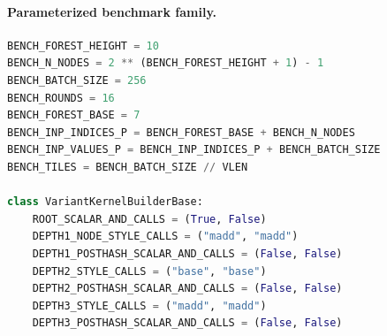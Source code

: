 \paragraph{Parameterized benchmark family.}
\begin{lstlisting}[style=papercode,language=Python]
BENCH_FOREST_HEIGHT = 10
BENCH_N_NODES = 2 ** (BENCH_FOREST_HEIGHT + 1) - 1
BENCH_BATCH_SIZE = 256
BENCH_ROUNDS = 16
BENCH_FOREST_BASE = 7
BENCH_INP_INDICES_P = BENCH_FOREST_BASE + BENCH_N_NODES
BENCH_INP_VALUES_P = BENCH_INP_INDICES_P + BENCH_BATCH_SIZE
BENCH_TILES = BENCH_BATCH_SIZE // VLEN

class VariantKernelBuilderBase:
    ROOT_SCALAR_AND_CALLS = (True, False)
    DEPTH1_NODE_STYLE_CALLS = ("madd", "madd")
    DEPTH1_POSTHASH_SCALAR_AND_CALLS = (False, False)
    DEPTH2_STYLE_CALLS = ("base", "base")
    DEPTH2_POSTHASH_SCALAR_AND_CALLS = (False, False)
    DEPTH3_STYLE_CALLS = ("madd", "madd")
    DEPTH3_POSTHASH_SCALAR_AND_CALLS = (False, False)
\end{lstlisting}

